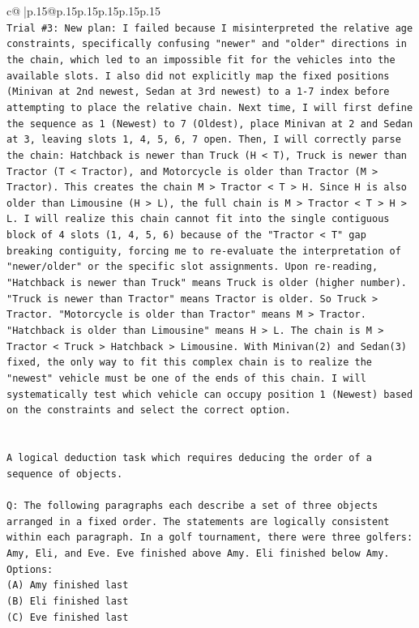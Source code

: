 \documentclass{article}
\begin{document}
{\begin{supertabular}{c@{$\;$}|p{.15\linewidth}@{}p{.15\linewidth}p{.15\linewidth}p{.15\linewidth}p{.15\linewidth}p{.15\linewidth}}
{{{\\ 
\texttt{Trial \#3: New plan: I failed because I misinterpreted the relative age constraints, specifically confusing "newer" and "older" directions in the chain, which led to an impossible fit for the vehicles into the available slots. I also did not explicitly map the fixed positions (Minivan at 2nd newest, Sedan at 3rd newest) to a 1{-}7 index before attempting to place the relative chain. Next time, I will first define the sequence as 1 (Newest) to 7 (Oldest), place Minivan at 2 and Sedan at 3, leaving slots 1, 4, 5, 6, 7 open. Then, I will correctly parse the chain: Hatchback is newer than Truck (H < T), Truck is newer than Tractor (T < Tractor), and Motorcycle is older than Tractor (M > Tractor). This creates the chain M > Tractor < T > H. Since H is also older than Limousine (H > L), the full chain is M > Tractor < T > H > L. I will realize this chain cannot fit into the single contiguous block of 4 slots (1, 4, 5, 6) because of the "Tractor < T" gap breaking contiguity, forcing me to re{-}evaluate the interpretation of "newer/older" or the specific slot assignments. Upon re{-}reading, "Hatchback is newer than Truck" means Truck is older (higher number). "Truck is newer than Tractor" means Tractor is older. So Truck > Tractor. "Motorcycle is older than Tractor" means M > Tractor. "Hatchback is older than Limousine" means H > L. The chain is M > Tractor < Truck > Hatchback > Limousine. With Minivan(2) and Sedan(3) fixed, the only way to fit this complex chain is to realize the "newest" vehicle must be one of the ends of this chain. I will systematically test which vehicle can occupy position 1 (Newest) based on the constraints and select the correct option.} \\
\\ 
\\ 
\texttt{A logical deduction task which requires deducing the order of a sequence of objects.} \\
\\ 
\texttt{Q: The following paragraphs each describe a set of three objects arranged in a fixed order. The statements are logically consistent within each paragraph. In a golf tournament, there were three golfers: Amy, Eli, and Eve. Eve finished above Amy. Eli finished below Amy.} \\
\texttt{Options:} \\
\texttt{(A) Amy finished last} \\
\texttt{(B) Eli finished last} \\
\texttt{(C) Eve finished last} \\
}}}
\end{supertabular}}
\end{document}
